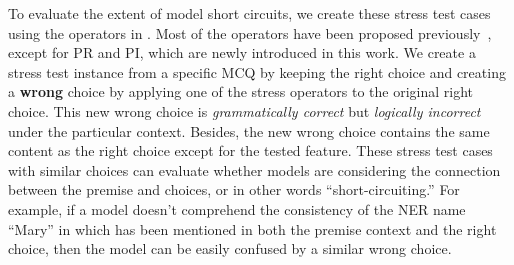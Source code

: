 To evaluate the extent of model short circuits,  
we create these stress test cases using the operators
in . 
Most of the operators
have been proposed previously~\cite{checklist2020acl}, 
except for PR and PI, which
are newly introduced in this work.
We create a stress test instance from a specific MCQ by 
keeping the right choice and
creating a \textbf{wrong} choice by applying one of the
stress operators to the original right choice. This new
wrong choice is \textit{grammatically correct}
but \textit{logically incorrect} under the particular context. 
Besides, the new wrong choice contains the same content as the right choice 
except for the tested feature. 
These stress test cases with similar choices can evaluate 
whether models 
are considering the connection between the premise and choices,
or in other words ``short-circuiting.'' 
For example, if a model 
doesn't comprehend the consistency of the 
NER name ``Mary'' in  which has
been mentioned in both the premise context and the right choice,  
then the model can be easily confused by a similar wrong choice. 
